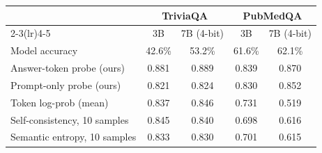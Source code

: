 \begin{tabular}{lcccc}
\toprule
 & \multicolumn{2}{c}{TriviaQA} & \multicolumn{2}{c}{PubMedQA} \\
\cmidrule(lr){2-3}\cmidrule(lr){4-5}
 & 3B & 7B (4-bit) & 3B & 7B (4-bit) \\
\midrule
Model accuracy & 42.6\% & 53.2\% & 61.6\% & 62.1\% \\
\midrule
Answer-token probe (ours) & 0.881 & 0.889 & 0.839 & 0.870 \\
Prompt-only probe (ours) & 0.821 & 0.824 & 0.830 & 0.852 \\
Token log-prob (mean) & 0.837 & 0.846 & 0.731 & 0.519 \\
Self-consistency, 10 samples & 0.845 & 0.840 & 0.698 & 0.616 \\
Semantic entropy, 10 samples & 0.833 & 0.830 & 0.701 & 0.615 \\
\bottomrule
\end{tabular}
